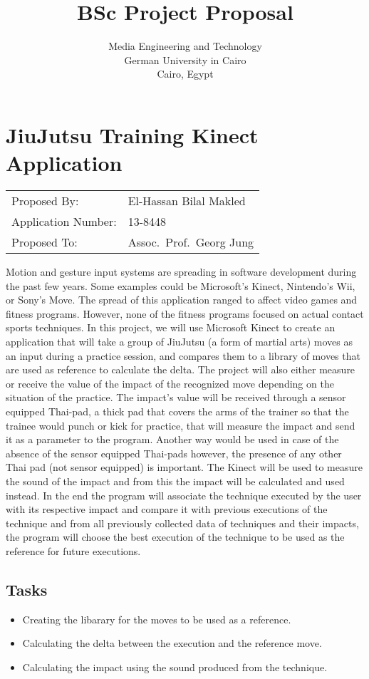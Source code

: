 \documentclass[11pt]{article} %
\title{BSc Project Proposal}
\author{Media Engineering and Technology\\ German University in Cairo\\ Cairo, Egypt}
\begin{document}
\maketitle

\section*{JiuJutsu Training Kinect Application}

\begin{tabular}{@{} l l}
  Proposed By: & El-Hassan Bilal Makled \\
  Application Number: & 13-8448 \\
  Proposed To: & Assoc.\ Prof.\ Georg Jung
\end{tabular}

\vspace*{\baselineskip}

Motion and gesture input systems are spreading in software development during the past few years. Some examples could be Microsoft's Kinect, Nintendo's Wii, or Sony's Move. 
The spread of this application ranged to affect video games and fitness programs. However, none of the fitness programs focused on actual contact sports techniques. 
In this project, we will use Microsoft Kinect to create an application that will take a group of JiuJutsu (a form of martial arts) moves as an input during a practice session, 
and compares them to a library of moves that are used as reference to calculate the delta. 
The project will also either measure or receive the value of the impact of the recognized move depending on the
situation of the practice. The impact's value will be received through a sensor equipped Thai-pad, a thick pad that covers the arms of the trainer so that the trainee would punch or kick for practice, that will measure the impact and send it as a parameter to the program. Another way would be used in case of the absence of the sensor equipped Thai-pads however, the presence of any other Thai pad (not sensor equipped) is important. The Kinect will be used to measure the sound of the impact and from this the impact will be calculated and used instead. In the end the program will associate the technique executed by the user with its respective impact and compare it with previous executions of the technique and from all previously collected data of techniques and their impacts, the program will choose the best execution of the technique to be used as the reference for future executions.

\subsection*{Tasks}
\begin{itemize}
\item Creating the libarary for the moves to be used as a reference.
\item Calculating the delta between the execution and the reference move.
\item Calculating the impact using the sound produced from the technique.
\end{itemize}
\end{document}
